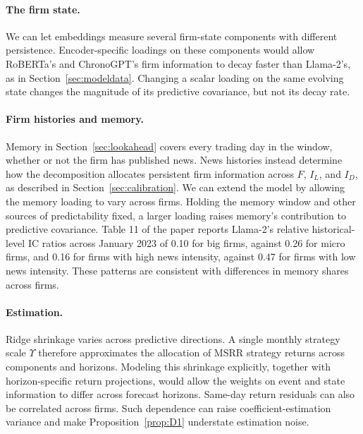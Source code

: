 \documentclass[11pt,letterpaper]{article}
\theoremstyle{remark}
\begin{document}
\paragraph{The firm state.}
We can let embeddings measure several firm-state components with different persistence. Encoder-specific loadings on these components would allow RoBERTa's and ChronoGPT's firm information to decay faster than Llama-2's, as in Section~\ref{sec:modeldata}. Changing a scalar loading on the same evolving state changes the magnitude of its predictive covariance, but not its decay rate.

\paragraph{Firm histories and memory.}
Memory in Section~\ref{sec:lookahead} covers every trading day in the window, whether or not the firm has published news. News histories instead determine how the decomposition allocates persistent firm information across $F$, $I_L$, and $I_D$, as described in Section~\ref{sec:calibration}. We can extend the model by allowing the memory loading to vary across firms. Holding the memory window and other sources of predictability fixed, a larger loading raises memory's contribution to predictive covariance. Table 11 of the paper reports Llama-2's relative historical-level IC ratios across January 2023 of 0.10 for big firms, against 0.26 for micro firms, and 0.16 for firms with high news intensity, against 0.47 for firms with low news intensity. These patterns are consistent with differences in memory shares across firms.

\paragraph{Estimation.}
Ridge shrinkage varies across predictive directions. A single monthly strategy scale $\Upsilon$ therefore approximates the allocation of MSRR strategy returns across components and horizons. Modeling this shrinkage explicitly, together with horizon-specific return projections, would allow the weights on event and state information to differ across forecast horizons. Same-day return residuals can also be correlated across firms. Such dependence can raise coefficient-estimation variance and make Proposition~\ref{prop:D1} understate estimation noise.
\end{document}
